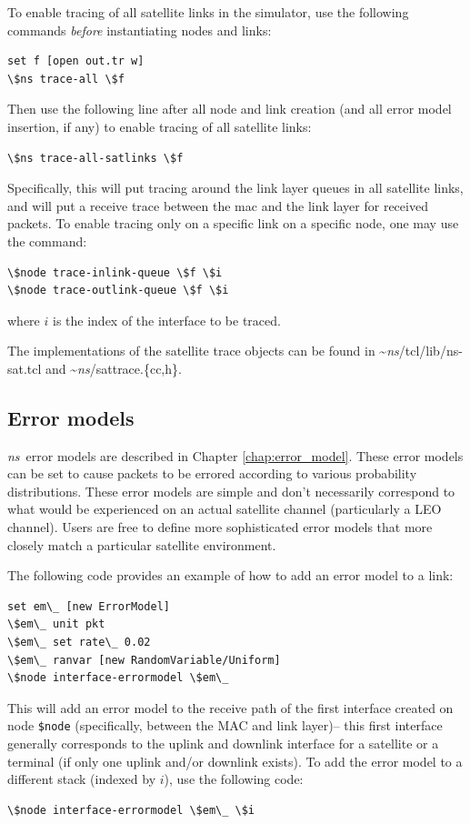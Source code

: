 To enable tracing of all satellite links in the simulator, use the following
commands {\em before} instantiating nodes and links:
\begin{verbatim}
set f [open out.tr w]
\$ns trace-all \$f
\end{verbatim}
Then use the following line after all node and link creation (and all
error model insertion, if any) to enable tracing of all satellite links:
\begin{verbatim}
\$ns trace-all-satlinks \$f
\end{verbatim}
Specifically, this will put tracing around the link layer queues in all
satellite links, and will put a receive trace between the mac and the
link layer for received packets.  To enable tracing only on a specific
link on a specific node, one may use the command:
\begin{verbatim}
\$node trace-inlink-queue \$f \$i
\$node trace-outlink-queue \$f \$i
\end{verbatim}
where $i$ is the index of the interface to be traced.  



The implementations of the satellite trace objects can be found in 
\textasciitilde\emph{ns}/{tcl/lib/ns-sat.tcl} and \textasciitilde\emph{ns}/{sattrace.\{cc,h\}}.


\subsection{Error models}
\label{sec:satellite/usage/error}

\emph{ns}~error models are described in Chapter \ref{chap:error_model}.  These
error models can be set to cause packets to be errored according to various
probability distributions.  These error models are simple and don't 
necessarily correspond to what would be experienced on an actual satellite
channel (particularly a LEO channel).  Users are 
free to define more sophisticated error models that more closely match a 
particular satellite environment.

The following code provides an example of how to add an error model to a
link:
\begin{verbatim}
set em\_ [new ErrorModel]
\$em\_ unit pkt
\$em\_ set rate\_ 0.02
\$em\_ ranvar [new RandomVariable/Uniform]
\$node interface-errormodel \$em\_ 
\end{verbatim}
This will add an error model to the receive path of the first interface
created on node {\tt \$node} (specifically, between the MAC and link layer)--
this first interface generally corresponds to the uplink and downlink
interface for a satellite or a terminal (if only one uplink and/or downlink
exists).
To add the error model to a different stack (indexed by $i$), use the 
following code:
\begin{verbatim}
\$node interface-errormodel \$em\_ \$i 
\end{verbatim}



